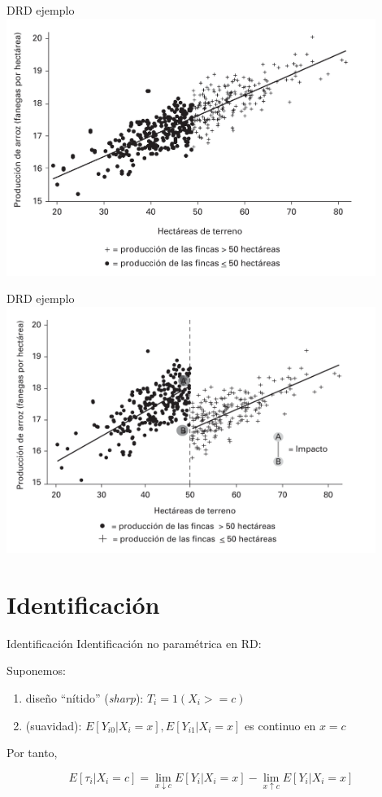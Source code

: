 \documentclass[
  ignorenonframetext,
]{beamer}
\providecommand{\tightlist}{%
  \setlength{\itemsep}{0pt}\setlength{\parskip}{0pt}}
\begin{document}
\begin{frame}{DRD ejemplo}
\protect\hypertarget{drd-ejemplo}{}
\includegraphics[width=0.9\textwidth,height=\textheight]{arroz}
\end{frame}

\begin{frame}{DRD ejemplo}
\protect\hypertarget{drd-ejemplo-1}{}
\includegraphics[width=0.9\textwidth,height=\textheight]{arroz2}
\end{frame}

\hypertarget{identificaciuxf3n}{%
\section{Identificación}\label{identificaciuxf3n}}

\begin{frame}{Identificación}
\protect\hypertarget{identificaciuxf3n-1}{}
Identificación no paramétrica en RD:

Suponemos:

\begin{enumerate}
\tightlist
\item
  diseño ``nítido'' (\emph{sharp}): \(T_i = 1(X_i >= c)\)
\item
  (suavidad): \(E[Y_{i0}|X_i=x], E[Y_{i1}|X_i=x]\) es continuo en
  \(x=c\)
\end{enumerate}

Por tanto,

\[E[\tau_i|X_i = c] = \lim_{x \downarrow  c}E[Y_i|X_i=x]-\lim_{x \uparrow  c}E[Y_i|X_i=x]\]
\end{frame}
\end{document}

